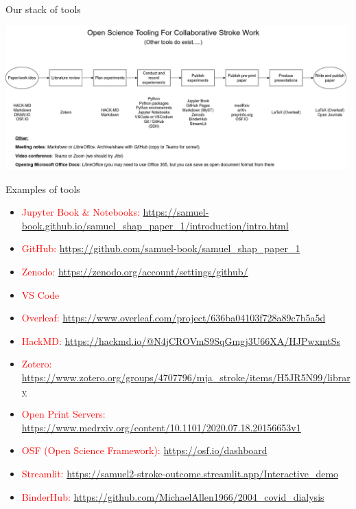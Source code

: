 \documentclass[xcolor={usenames,dvipsnames}]{beamer}
\newcommand{\smallurl}[1]{\textcolor{blue}{\fontsize{5pt}{5.8pt}\selectfont \url{#1}}}
\begin{document}

\begin{frame}{Our stack of tools}


\begin{center}
\includegraphics[width=0.99\textwidth]{./images/open_science_light}
\end{center}

\end{frame}


\begin{frame}{Examples of tools}

\footnotesize

\begin{itemize}
    \item \textcolor{red}{Jupyter Book \& Notebooks:} 
    \smallurl{https://samuel-book.github.io/samuel_shap_paper_1/introduction/intro.html}
    \item \textcolor{red}{GitHub:} 
    \smallurl{https://github.com/samuel-book/samuel_shap_paper_1}
    \item \textcolor{red}{Zenodo:} 
    \smallurl{https://zenodo.org/account/settings/github/}
    \item \textcolor{red}{VS Code}
    \item \textcolor{red}{Overleaf:}
    \smallurl{https://www.overleaf.com/project/636ba04103f728a89c7b5a5d}
    \item \textcolor{red}{HackMD: }
    \smallurl{https://hackmd.io/@N4jCROVmS9SqGmgj3U66XA/HJPwxmtSs}
    \item \textcolor{red}{Zotero: }
    \smallurl{https://www.zotero.org/groups/4707796/mja_stroke/items/H5JR5N99/library}
    \item \textcolor{red}{Open Print Servers:}
    \smallurl{https://www.medrxiv.org/content/10.1101/2020.07.18.20156653v1}
    \item \textcolor{red}{OSF (Open Science Framework):}
    \smallurl{https://osf.io/dashboard}
    \item \textcolor{red}{Streamlit: }
    \smallurl{https://samuel2-stroke-outcome.streamlit.app/Interactive_demo}
    \item \textcolor{red}{BinderHub: }
    \smallurl{https://github.com/MichaelAllen1966/2004_covid_dialysis}
    
    
\end{itemize}


\end{frame}
\end{document}
